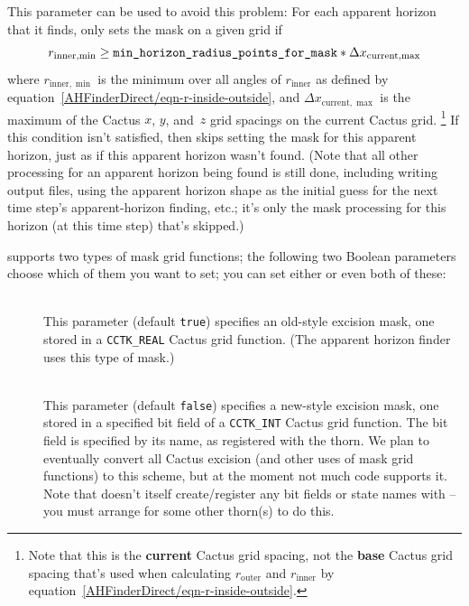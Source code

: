 \begin{description}
	This parameter can be used to avoid this problem:
	For each apparent horizon that it finds, 
	only sets the mask on a given grid if
	\begin{equation}
	r_{\text{inner},\min} \ge \verb|min_horizon_radius_points_for_mask|
		     * {\Delta x}_{\text{current},\max}
	\end{equation}
	where $r_{\text{inner},\min}$ is the minimum over all angles
	of $r_\text{inner}$ as defined by
	equation~\eqref{AHFinderDirect/eqn-r-inside-outside},
	and ${\Delta x}_{\text{current},\max}$ is the maximum of the
	Cactus $x$, $y$, and~$z$ grid spacings on the current Cactus
	grid.%
\footnote{%
	 Note that this is the {\bf current\/} Cactus
	 grid spacing, not the {\bf base\/} Cactus grid
	 spacing that's used when calculating
	 $r_\text{outer}$ and $r_\text{inner}$ by
	 equation~\eqref{AHFinderDirect/eqn-r-inside-outside}.
	 }%
{}	If this condition isn't satisfied, then 
	skips setting the mask for this apparent horizon, just as if
	this apparent horizon wasn't found.  (Note that all other
	processing for an apparent horizon being found is still done,
	including writing output files, using the apparent horizon shape
	as the initial guess for the next time step's apparent-horizon
	finding, etc.; it's only the mask processing for this horizon
	(at this time step) that's skipped.)
\end{description}

 supports two types of mask grid functions;
the following two Boolean parameters choose which of them you want
to set; you can set either or even both of these:
\begin{description}
\item[]
\mbox{}\\
	This parameter (default \verb|true|) specifies an
	old-style excision mask, one stored in a \verb|CCTK_REAL|
	Cactus grid function.  (The  apparent horizon
	finder uses this type of mask.)

\item[]
\mbox{}\\
	This parameter (default \verb|false|) specifies a
	new-style excision mask, one stored in a specified bit field
	of a \verb|CCTK_INT| Cactus grid function.
	The bit field is specified by its name,
	as registered with the  thorn.
	We plan to eventually convert all Cactus excision
	(and other uses of mask grid functions) to this scheme,
	but at the moment not much code supports it.
	Note that  doesn't itself create/register
	any bit fields or state names with  --
	you must arrange for some other thorn(s) to do this.
\end{description}

